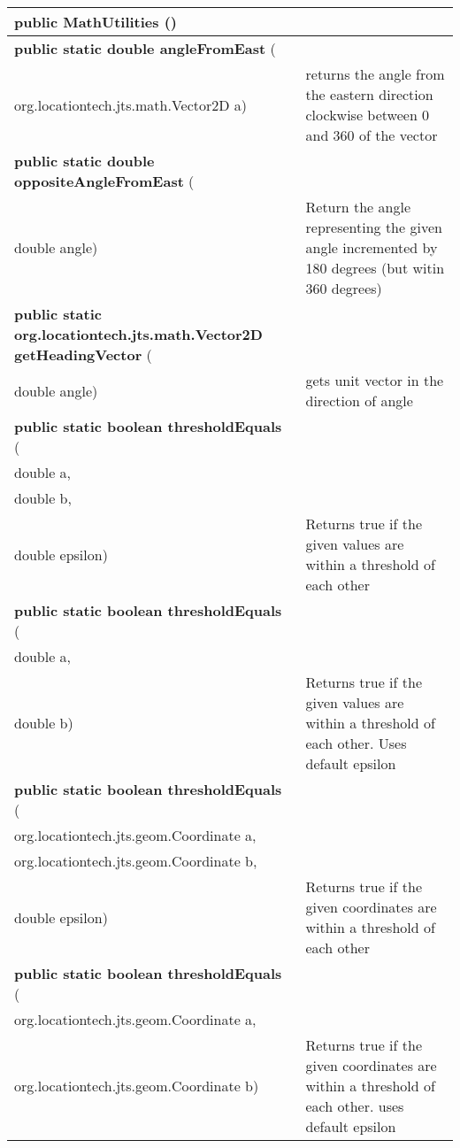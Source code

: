  { 
 
\begin{tabular}{ p{3in}|m{3.4in}}
\textbf{public MathUtilities} () & \\ \hline 
\textbf{public static double angleFromEast } (\\ \hspace*{ 5pt} org.locationtech.jts.math.Vector2D a) & returns the angle from the eastern direction clockwise between 0 and 360 of the vector\\ \hline 
\textbf{public static double oppositeAngleFromEast } (\\ \hspace*{ 5pt} double angle) & Return the angle representing the given angle incremented by 180 degrees (but witin 360 degrees)\\ \hline 
\textbf{public static org.locationtech.jts.math.Vector2D getHeadingVector } (\\ \hspace*{ 5pt} double angle) & gets unit vector in the direction of angle\\ \hline 
\textbf{public static boolean thresholdEquals } (\\ \hspace*{ 5pt} double a,\\\hspace*{ 5pt} double b,\\\hspace*{ 5pt} double epsilon) & Returns true if the given values are within a threshold of each other\\ \hline 
\textbf{public static boolean thresholdEquals } (\\ \hspace*{ 5pt} double a,\\\hspace*{ 5pt} double b) & Returns true if the given values are within a threshold of each other. Uses default epsilon\\ \hline 
\textbf{public static boolean thresholdEquals } (\\ \hspace*{ 5pt} org.locationtech.jts.geom.Coordinate a,\\\hspace*{ 5pt} org.locationtech.jts.geom.Coordinate b,\\\hspace*{ 5pt} double epsilon) & Returns true if the given coordinates are within a threshold of each other\\ \hline 
\textbf{public static boolean thresholdEquals } (\\ \hspace*{ 5pt} org.locationtech.jts.geom.Coordinate a,\\\hspace*{ 5pt} org.locationtech.jts.geom.Coordinate b) & Returns true if the given coordinates are within a threshold of each other. uses default epsilon\\ \hline 
\end{tabular}
}
